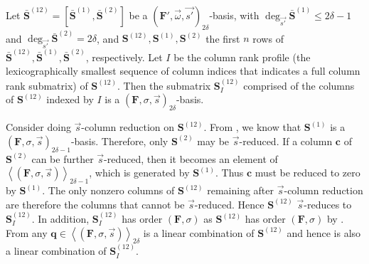 \begin{lem}
\label{lem:2deltaBasis} Let $\bar{\mathbf{S}}^{\left(12\right)}=[\bar{\mathbf{S}}^{\left(1\right)},\bar{\mathbf{S}}^{\left(2\right)}]$
be a $(\mathbf{F}',\vec{\omega},\vec{s'})_{2\delta}$-basis, with
$\deg_{\vec{s'}}\bar{\mathbf{S}}^{\left(1\right)}\le2\delta-1$ and
$\deg_{\vec{s'}}\bar{\mathbf{S}}^{\left(2\right)}=2\delta$, and $\mathbf{S}^{\left(12\right)},\mathbf{S}^{\left(1\right)},\mathbf{S}^{\left(2\right)}$
the first $n$ rows of $\bar{\mathbf{S}}^{\left(12\right)},\bar{\mathbf{S}}^{\left(1\right)},\bar{\mathbf{S}}^{\left(2\right)}$,
respectively. Let $I$ be the column rank profile (the lexicographically
smallest sequence of column indices that indicates a full column rank
submatrix) of $\mathbf{S}^{\left(12\right)}$. %
Then the submatrix\textbf{ $\mathbf{S}_{I}^{\left(12\right)}$ }comprised
of the columns of $\mathbf{S}^{\left(12\right)}$ indexed by $I$
is a $\left(\mathbf{F},\sigma,\vec{s}\right)_{2\delta}$-basis. \end{lem}
\begin{pf}
Consider doing $\vec{s}$-column reduction on $\mathbf{S}^{\left(12\right)}$.
From , we know that $\mathbf{S}^{\left(1\right)}$
is a $\left(\mathbf{F},\sigma,\vec{s}\right)_{2\delta-1}$-basis.
Therefore, only $\mathbf{S}^{\left(2\right)}$ may be $\vec{s}$-reduced.
If a column $\mathbf{c}$ of $\mathbf{S}^{\left(2\right)}$ can be
further $\vec{s}$-reduced, then it becomes an element of $\left\langle \left(\mathbf{F},\sigma,\vec{s}\right)\right\rangle _{2\delta-1}$,
which is generated by $\mathbf{S}^{\left(1\right)}$. Thus $\mathbf{c}$
must be reduced to zero by $\mathbf{S}^{\left(1\right)}$. The only
nonzero columns of $\mathbf{S}^{\left(12\right)}$ remaining after
$\vec{s}$-column reduction are therefore the columns that cannot
be $\vec{s}$-reduced. Hence $\mathbf{S}^{\left(12\right)}$ $\vec{s}$-reduces
to \textbf{$\mathbf{S}_{I}^{\left(12\right)}$}. In addition, \textbf{$\mathbf{S}_{I}^{\left(12\right)}$}
has order $\left(\mathbf{F},\sigma\right)$ as $\mathbf{S}^{\left(12\right)}$
has order $\left(\mathbf{F},\sigma\right)$ by .
From  any $\mathbf{q}\in\left\langle \left(\mathbf{F},\sigma,\vec{s}\right)\right\rangle _{2\delta}$
is a linear combination of $\mathbf{S}^{\left(12\right)}$ and hence
is also a linear combination of $\mathbf{S}_{I}^{\left(12\right)}$. 
\end{pf}
